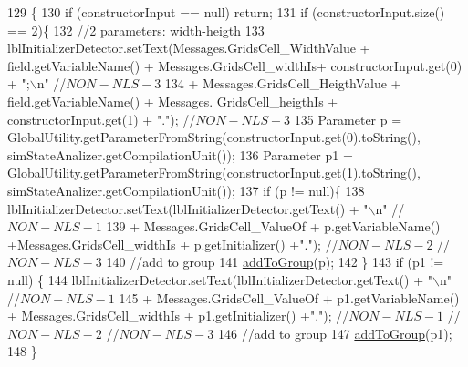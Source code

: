 \begin{DoxyCode}
129                                                                                                            
                 \{
130         \textcolor{keywordflow}{if} (constructorInput == null)   \textcolor{keywordflow}{return};
131         \textcolor{keywordflow}{if} (constructorInput.size() == 2)\{
132             \textcolor{comment}{//2 parameters: width-heigth}
133             lblInitializerDetector.setText(Messages.GridsCell\_WidthValue + field.getVariableName() + 
      Messages.GridsCell\_widthIs+ constructorInput.get(0) + \textcolor{stringliteral}{";\(\backslash\)n"} \textcolor{comment}{//$NON-NLS-3$}
134                                     + Messages.GridsCell\_HeigthValue + field.getVariableName() + Messages.
      GridsCell\_heigthIs + constructorInput.get(1) + \textcolor{stringliteral}{"."}); \textcolor{comment}{//$NON-NLS-3$}
135             Parameter p = GlobalUtility.getParameterFromString(constructorInput.get(0).toString(), 
      simStateAnalizer.getCompilationUnit());
136             Parameter p1 = GlobalUtility.getParameterFromString(constructorInput.get(1).toString(), 
      simStateAnalizer.getCompilationUnit());
137             \textcolor{keywordflow}{if} (p != null)\{ 
138                 lblInitializerDetector.setText(lblInitializerDetector.getText() + \textcolor{stringliteral}{"\(\backslash\)n"} \textcolor{comment}{//$NON-NLS-1$}
139                     + Messages.GridsCell\_ValueOf + p.getVariableName() +Messages.GridsCell\_widthIs  + 
      p.getInitializer() +\textcolor{stringliteral}{"."}); \textcolor{comment}{//$NON-NLS-2$ //$NON-NLS-3$}
140                 \textcolor{comment}{//add to group}
141                 \hyperlink{classit_1_1isislab_1_1masonhelperdocumentation_1_1mason_1_1wizards_1_1_g___grids_cell_page_a43c0ab8367d25f1cfd0cdc9e29f46e5c}{addToGroup}(p);
142             \}
143             \textcolor{keywordflow}{if} (p1 != null) \{
144                 lblInitializerDetector.setText(lblInitializerDetector.getText() + \textcolor{stringliteral}{"\(\backslash\)n"} \textcolor{comment}{//$NON-NLS-1$}
145                     +  Messages.GridsCell\_ValueOf + p1.getVariableName() + Messages.GridsCell\_widthIs + 
      p1.getInitializer() +\textcolor{stringliteral}{"."}); \textcolor{comment}{//$NON-NLS-1$ //$NON-NLS-2$ //$NON-NLS-3$}
146                 \textcolor{comment}{//add to group}
147                 \hyperlink{classit_1_1isislab_1_1masonhelperdocumentation_1_1mason_1_1wizards_1_1_g___grids_cell_page_a43c0ab8367d25f1cfd0cdc9e29f46e5c}{addToGroup}(p1);
148             \}

\end{DoxyCode}
